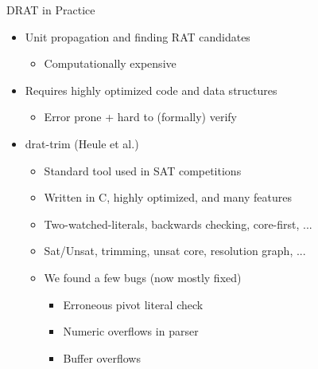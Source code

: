 \documentclass[fleqn]{beamer}
\begin{document}
\begin{frame}{DRAT in Practice}
  \begin{itemize}
   \item<+-> Unit propagation and finding RAT candidates
    \begin{itemize}
     \item Computationally expensive
    \end{itemize}
   \item<+-> Requires highly optimized code and data structures
    \begin{itemize}
     \item Error prone + hard to (formally) verify
    \end{itemize}
   \item<+-> drat-trim (Heule et al.)
    \begin{itemize}
     \item Standard tool used in SAT competitions
     \item Written in C, highly optimized, and many features
     \item Two-watched-literals, backwards checking, core-first, ...
     \item Sat/Unsat, trimming, unsat core, resolution graph, ...
     \item<+-> We found a few bugs (now mostly fixed)
      \begin{itemize}
       \item Erroneous pivot literal check
       \item Numeric overflows in parser
       \item Buffer overflows
      

      \end{itemize}
    \end{itemize}
  \end{itemize}
\end{frame}
\end{document}
